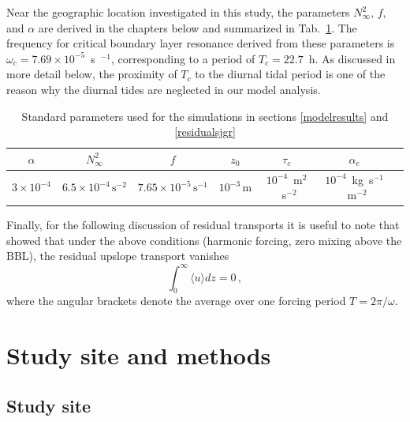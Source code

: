 Near the geographic location investigated in this study, the
parameters $N^2_\infty,\, f,$ and $\alpha$ are derived in the chapters
below and summarized in Tab.\ \ref{input}. The frequency for critical
boundary layer resonance derived from these parameters is $\omega_c =
7.69 \times 10^{-5}$~s~$^{-1}$, corresponding to a period of $T_c = 22.7$~h. As
discussed in more detail below, the proximity of $T_c$ to the diurnal
tidal period is one of the reason why the diurnal tides are neglected
in our model analysis.

\begin{table}
\caption{Standard parameters used for the simulations in sections
  \ref{modelresults} and \ref{residualsjgr}}\label{input}
\begin{center}
\begin{tabular}{ccccccc}
\hline
\hline
$\alpha$ & $N_\infty^2$ & $f$ & $z_0$ & $\tau_c$ & $\alpha_e$ \\
\hline
$3 \times 10^{-4}$ & $6.5 \times 10^{-4}\, \text{s}^{-2}$ & $7.65 \times 
10^{-5}\, 
\text{s}^{-1}$ & $10^{-3}\, \text{m}$ & $10^{-4}$~m$^2$~s$^{-2}$ & 
$10^{-4}$~kg~s$^{-1}$~m$^{-2}$ \\
\hline
\end{tabular}
\end{center}
\end{table}

Finally, for the following discussion of residual transports it is
useful to note that \cite{UmlaufBurchard2011a} showed that under the
above conditions (harmonic forcing, zero mixing above the BBL), the
residual upslope transport vanishes
\begin{equation}
  \label{uint}
  \int_0^\infty \langle u \rangle dz = 0 \, ,
\end{equation}
where the angular brackets denote the average over one forcing period
$T = 2 \pi / \omega$.

\section{Study site and methods}\label{methods}

\subsection{Study site}

